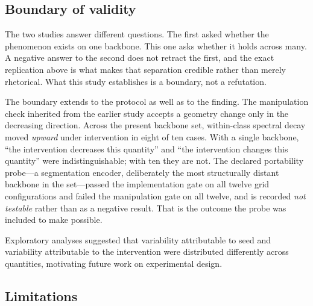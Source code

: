 \documentclass[11pt,a4paper]{article}
\begin{document}
\subsection{Boundary of validity}

The two studies answer different questions. The first asked whether the
phenomenon exists on one backbone. This one asks whether it holds across many. A
negative answer to the second does not retract the first, and the exact
replication above is what makes that separation credible rather than merely
rhetorical. What this study establishes is a boundary, not a refutation.

The boundary extends to the protocol as well as to the finding. The manipulation
check inherited from the earlier study accepts a geometry change only in the
decreasing direction. Across the present backbone set, within-class spectral
decay moved \emph{upward} under intervention in eight of ten cases. With a single
backbone, ``the intervention decreases this quantity'' and ``the intervention
changes this quantity'' were indistinguishable; with ten they are not. The
declared portability probe---a segmentation encoder, deliberately the most
structurally distant backbone in the set---passed the implementation gate on all
twelve grid configurations and failed the manipulation gate on all twelve, and is
recorded \emph{not testable} rather than as a negative result. That is the
outcome the probe was included to make possible.

Exploratory analyses suggested that variability attributable to seed and
variability attributable to the intervention were distributed differently across
quantities, motivating future work on experimental design.

%

\subsection{Limitations}
\end{document}
